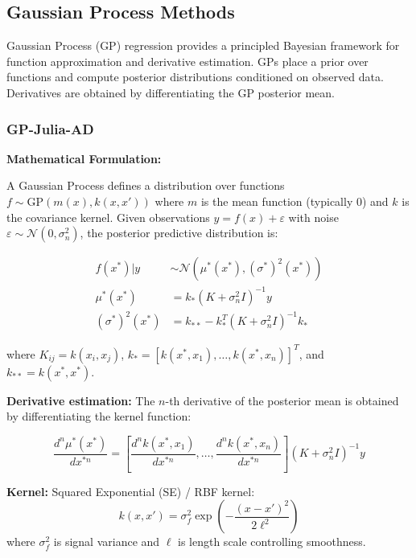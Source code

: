\subsection{Gaussian Process Methods}
\label{sec:gp_methods}

Gaussian Process (GP) regression provides a principled Bayesian framework for function approximation and derivative estimation. GPs place a prior over functions and compute posterior distributions conditioned on observed data. Derivatives are obtained by differentiating the GP posterior mean.

\subsubsection{GP-Julia-AD}

\textbf{Mathematical Formulation:}

A Gaussian Process defines a distribution over functions $f \sim \text{GP}(m(x), k(x,x'))$ where $m$ is the mean function (typically 0) and $k$ is the covariance kernel. Given observations $y = f(x) + \varepsilon$ with noise $\varepsilon \sim \mathcal{N}(0, \sigma^2_n)$, the posterior predictive distribution is:

\begin{align}
f(x^*) | y &\sim \mathcal{N}(\mu^*(x^*), (\sigma^*)^2(x^*)) \\
\mu^*(x^*) &= k_*(K + \sigma^2_n I)^{-1} y \\
(\sigma^*)^2(x^*) &= k_{**} - k_*^T(K + \sigma^2_n I)^{-1} k_*
\end{align}

where $K_{ij} = k(x_i, x_j)$, $k_* = [k(x^*, x_1), \ldots, k(x^*, x_n)]^T$, and $k_{**} = k(x^*, x^*)$.

\textbf{Derivative estimation:} The $n$-th derivative of the posterior mean is obtained by differentiating the kernel function:

\begin{equation}
\frac{d^n \mu^*(x^*)}{dx^{*n}} = \left[\frac{d^n k(x^*, x_1)}{dx^{*n}}, \ldots, \frac{d^n k(x^*, x_n)}{dx^{*n}}\right] (K + \sigma^2_n I)^{-1} y
\end{equation}

\textbf{Kernel:} Squared Exponential (SE) / RBF kernel:
\begin{equation}
k(x, x') = \sigma^2_f \exp\left(-\frac{(x - x')^2}{2\ell^2}\right)
\end{equation}
where $\sigma^2_f$ is signal variance and $\ell$ is length scale controlling smoothness.

